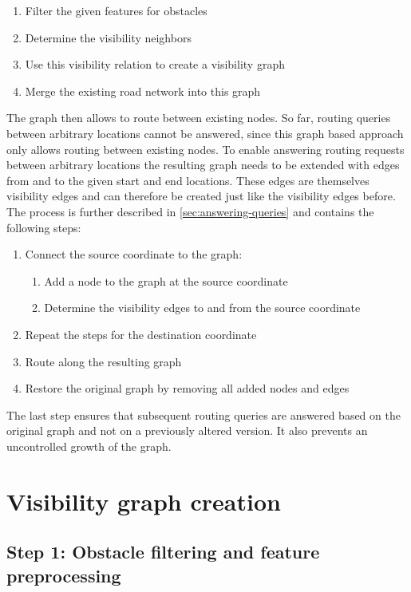 		\begin{enumerate}
			\item Filter the given features for obstacles
			\item Determine the visibility neighbors
			\item Use this visibility relation to create a visibility graph
			\item Merge the existing road network into this graph
		\end{enumerate}
	
		The graph then allows to route between existing nodes.
		So far, routing queries between arbitrary locations cannot be answered, since this graph based approach only allows routing between existing nodes.
		To enable answering routing requests between arbitrary locations the resulting graph needs to be extended with edges from and to the given start and end locations.
		These edges are themselves visibility edges and can therefore be created just like the visibility edges before. The process is further described in \cref{sec:answering-queries} and contains the following steps:
		
		\begin{enumerate}
			\item Connect the source coordinate to the graph:
			\begin{enumerate}
				\item Add a node to the graph at the source coordinate
				\item Determine the visibility edges to and from the source coordinate
			\end{enumerate}
			\item Repeat the steps for the destination coordinate
			\item Route along the resulting graph
			\item Restore the original graph by removing all added nodes and edges
		\end{enumerate}
	
		The last step ensures that subsequent routing queries are answered based on the original graph and not on a previously altered version.
		It also prevents an uncontrolled growth of the graph.
		
\section{Visibility graph creation}
\label{sec:visibility-graph-creation}
		
	\subsection{Step 1: Obstacle filtering and feature preprocessing}
	\label{subsec:step-1-preprocessing}
			
